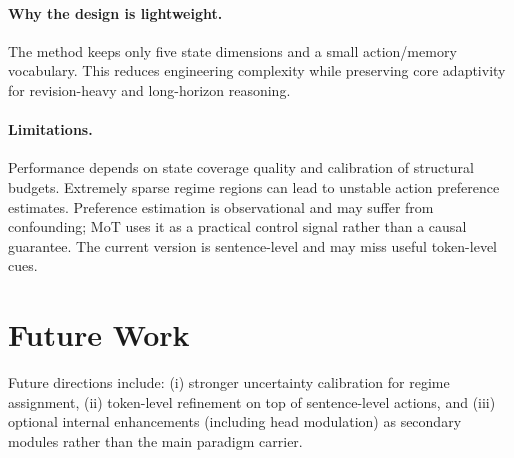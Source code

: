 \documentclass{article}
\begin{document}
\paragraph{Why the design is lightweight.}
The method keeps only five state dimensions and a small action/memory vocabulary. This reduces engineering complexity while preserving core adaptivity for revision-heavy and long-horizon reasoning.

\paragraph{Limitations.}
Performance depends on state coverage quality and calibration of structural budgets. Extremely sparse regime regions can lead to unstable action preference estimates. Preference estimation is observational and may suffer from confounding; MoT uses it as a practical control signal rather than a causal guarantee. The current version is sentence-level and may miss useful token-level cues.

\section{Future Work}
\label{sec:future}

Future directions include: (i) stronger uncertainty calibration for regime assignment, (ii) token-level refinement on top of sentence-level actions, and (iii) optional internal enhancements (including head modulation) as secondary modules rather than the main paradigm carrier.




\end{document}
